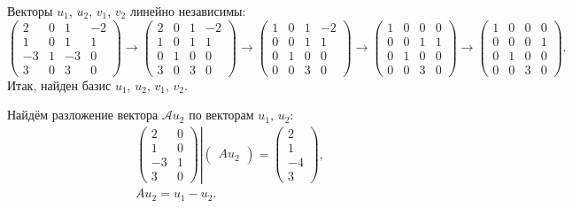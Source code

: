 \documentclass[12pt]{article}
\begin{document}
    Векторы $u_1$, $u_2$, $v_1$, $v_2$ линейно независимы:
    \[
        \begin{pmatrix}
            2  & 0 & 1  & -2 \\
            1  & 0 & 1  & 1  \\
            -3 & 1 & -3 & 0  \\
            3  & 0 & 3  & 0
        \end{pmatrix}
        \rightarrow
        \begin{pmatrix}
            2 & 0 & 1 & -2 \\
            1 & 0 & 1 & 1  \\
            0 & 1 & 0 & 0  \\
            3 & 0 & 3 & 0
        \end{pmatrix}
        \rightarrow
        \begin{pmatrix}
            1 & 0 & 1 & -2 \\
            0 & 0 & 1 & 1  \\
            0 & 1 & 0 & 0  \\
            0 & 0 & 3 & 0
        \end{pmatrix}
        \rightarrow
        \begin{pmatrix}
            1 & 0 & 0 & 0 \\
            0 & 0 & 1 & 1 \\
            0 & 1 & 0 & 0 \\
            0 & 0 & 3 & 0
        \end{pmatrix}
        \rightarrow
        \begin{pmatrix}
            1 & 0 & 0 & 0 \\
            0 & 0 & 0 & 1 \\
            0 & 1 & 0 & 0 \\
            0 & 0 & 3 & 0
        \end{pmatrix}
        .
    \]
    Итак, найден базис $u_1$, $u_2$, $v_1$, $v_2$.

    Найдём разложение вектора $\mathcal{A} u_2$ по векторам $u_1$, $u_2$:
    \begin{gather*}
        \left .
        \begin{pmatrix}
            2  & 0 \\
            1  & 0 \\
            -3 & 1 \\
            3  & 0
        \end{pmatrix}
        \right |
        \begin{pmatrix}
            A u_2
        \end{pmatrix}
        =
        \begin{pmatrix}
            2  \\
            1  \\
            -4 \\
            3
        \end{pmatrix} , \\
        A u_2 = u_1 - u_2 .
    \end{gather*}
\end{document}
